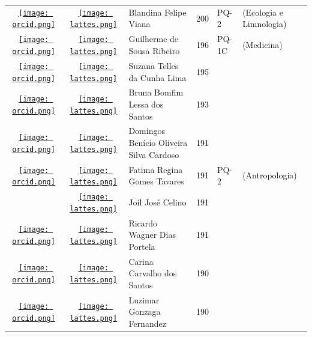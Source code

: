 \documentclass[12pt,brazil]{article}\usepackage[]{graphicx}\usepackage[]{xcolor}
\begin{document}
\begin{longtable}{cclrll}
\href{https://orcid.org/0000-0002-4924-1257}{\texttt{[image: orcid.png]}} & \href{http://lattes.cnpq.br/3442332785666908}{\texttt{[image: lattes.png]}} & Blandina Felipe Viana & 200 & PQ-2 & (Ecologia e Limnologia) \\

\href{https://orcid.org/0000-0002-6798-2059}{\texttt{[image: orcid.png]}} & \href{http://lattes.cnpq.br/9005813884698823}{\texttt{[image: lattes.png]}} & Guilherme de Sousa Ribeiro & 196 & PQ-1C & (Medicina) \\

\href{http://orcid.org/0000-0002-9099-324X}{\texttt{[image: orcid.png]}} & \href{http://lattes.cnpq.br/1235128239764591}{\texttt{[image: lattes.png]}} & Suzana Telles da Cunha Lima & 195 &  &  \\

\href{https://orcid.org/0000-0003-4485-203X}{\texttt{[image: orcid.png]}} & \href{http://lattes.cnpq.br/4775068257764378}{\texttt{[image: lattes.png]}} & Bruna Bomfim Lessa dos Santos & 193 &  &  \\

\href{https://orcid.org/0000-0001-7072-2656}{\texttt{[image: orcid.png]}} & \href{http://lattes.cnpq.br/2228981567893077}{\texttt{[image: lattes.png]}} & Domingos Benício Oliveira Silva Cardoso & 191 &  &  \\

\href{https://orcid.org/0000-0001-6668-4300}{\texttt{[image: orcid.png]}} & \href{http://lattes.cnpq.br/6141190119426087}{\texttt{[image: lattes.png]}} & Fatima Regina Gomes Tavares & 191 & PQ-2 & (Antropologia) \\

 & \href{http://lattes.cnpq.br/8472472348669864}{\texttt{[image: lattes.png]}} & Joil José Celino & 191 &  &  \\

\href{https://orcid.org/0000-0001-9095-776X}{\texttt{[image: orcid.png]}} & \href{http://lattes.cnpq.br/3118063347109613}{\texttt{[image: lattes.png]}} & Ricardo Wagner Dias Portela & 191 &  &  \\

\href{https://orcid.org/0000-0002-2898-0851}{\texttt{[image: orcid.png]}} & \href{http://lattes.cnpq.br/7313535995130086}{\texttt{[image: lattes.png]}} & Carina Carvalho dos Santos & 190 &  &  \\

\href{https://orcid.org/0000-0003-0837-6101}{\texttt{[image: orcid.png]}} & \href{http://lattes.cnpq.br/5869970809916591}{\texttt{[image: lattes.png]}} & Luzimar Gonzaga Fernandez & 190 &  &  \\


\end{longtable}
\end{document}
